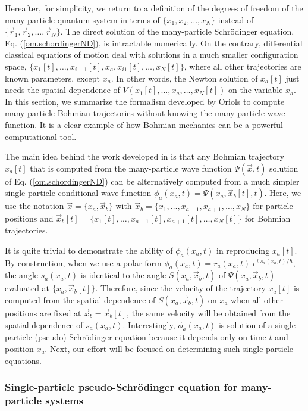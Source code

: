 \documentclass[nofootinbib, secnumarabic, amsmath, nobibnotes,10pt,aps,pra]{revtex4-1}
\newcommand{\eref}[1]{Eq. (\ref{#1})}
\begin{document}
Hereafter, for simplicity, we return to a definition of the degrees
of freedom of the many-particle quantum system in terms of 
$\{x_1, x_2,\ldots ,x_N\}$ instead of $\{ \vec r_1,\vec r_2, \ldots
,\vec r_N \}$. The direct solution of  the many-particle
Schr\"odinger equation, \eref{om.schordingerND}, is intractable
numerically. On the contrary, differential classical
equations of motion deal with solutions in a much smaller configuration
space,  $\{x_1[t],\ldots,x_{i -
1}[t],x_a,x_{i1}[t],\ldots,x_N[t]\}$, where all other trajectories
are known parameters, except $x_a$. In other words, the Newton
solution of $x_a[t]$ just needs the spatial dependence of
$V(x_1[t],\ldots,x_a,\ldots,x_N[t])$ on the variable $x_a$. In this
section, we summarize the formalism developed by Oriols \cite{om.oriolsprl} to compute many-particle Bohmian trajectories
without knowing the many-particle wave function. It is a clear
example of how Bohmian mechanics can be a powerful computational 
tool.

The main idea behind the work developed in \cite{om.oriolsprl} is
that any Bohmian trajectory $x_a[t]$ that is computed from the
many-particle wave function $\Psi(\vec x,t)$ solution of
\eref{om.schordingerND} can be alternatively computed from a much
simpler single-particle conditional wave function $\phi_a(x_a,t) = \Psi(x_a,\vec
x_b[t],t)$. Here, we use the notation $\vec x = \{x_a,\vec x_b\}$
with $\vec x_b = \{x_1,\ldots,x_{a-1},x_{a + 1},\ldots,x_N\}$ for
particle positions and $\vec x_b[t] =
\{x_1[t],\ldots,x_{a-1}[t],x_{a + 1}[t],\ldots,x_N[t]\}$ for Bohmian
trajectories.

It is quite trivial to demonstrate the ability of $\phi_a(x_a,t)$ in
reproducing $x_a[t]$. By construction, when we use a polar form
$\phi_a(x_a,t) = r_a(x_a,t) \; e^{i \; s_a(x_a,t)/\hbar}$, the angle
$s_a(x_a,t)$ is identical to the angle $S(x_a,\vec x_b,t)$ of
$\Psi(x_a,\vec x_b,t)$ evaluated at $\{x_a,\vec x_b[t]\}$.
Therefore, since the velocity of the trajectory $x_a[t]$ is computed
from the spatial dependence of $S(x_a,\vec x_b,t)$ on $x_a$ when all
other positions are fixed at $\vec x_b = \vec x_b[t]$, the same
velocity will be obtained from the spatial dependence of
$s_a(x_a,t)$. Interestingly, $\phi_a(x_a,t)$ is solution of a
single-particle (pseudo) Schr\"odinger equation because it depends
only on time $t$ and position $x_a$. Next, our effort will be
focused on determining such single-particle  equations.

\subsubsection{Single-particle pseudo-Schr\"odinger equation for many-particle systems}
\end{document}

